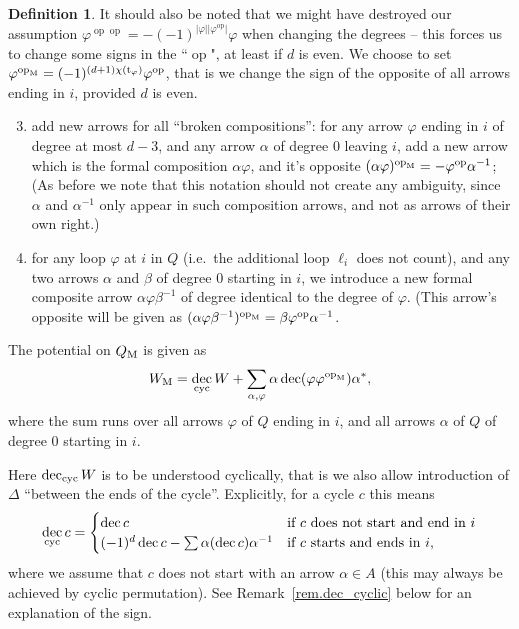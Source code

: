\documentclass[a4paper,11pt]{amsart}
\theoremstyle{definition}
\newtheorem{definition}[theorem]{Definition}
\DeclareMathOperator{\op}{op}
\DeclareMathOperator{\dec}{dec}
\newcommand{\m}{_{\rm M}}
\newcommand{\ci}[1]{\chi(#1)}
\numberwithin{theorem}{section}
\begin{document}
\begin{definition}
It should also be noted that we might have destroyed our assumption $\varphi^{\op \op} = - (-1)^{| \varphi| | \varphi^{\op} |} \varphi$ when changing the degrees -- this forces us to change some signs in the ``$\op$", at least if $d$ is even. We choose to set $\varphi^{\op\m} = (-1)^{(d+1) \ci{ \rm{t}_{\varphi}}} \varphi^{\op}$, that is we change the sign of the opposite of all arrows ending in $i$, provided $d$ is even.
\begin{enumerate}
\setcounter{enumi}{2}
\item add new arrows for all ``broken compositions'': for any arrow $\varphi$ ending in $i$ of degree at most $d-3$, and any arrow $\alpha$ of degree $0$ leaving $i$, add a new arrow which is the formal composition $\alpha \varphi$, and it's opposite $(\alpha \varphi)^{\op\m} = - \varphi^{\op} \alpha^{-1}$; (As before we note that this notation should not create any ambiguity, since $\alpha$ and $\alpha^{-1}$ only appear in such composition arrows, and not as arrows of their own right.)
\item for any loop $\varphi$ at $i$ in $Q$ (i.e.\ the additional loop $\ell_i$ does not count), and any two arrows $\alpha$ and $\beta$ of degree $0$ starting in $i$, we introduce a new formal composite arrow $\alpha \varphi \beta^{-1}$ of degree identical to the degree of $\varphi$. (This arrow's opposite will be given as $(\alpha \varphi \beta^{-1})^{\op\m} = \beta \varphi^{\op} \alpha^{-1}$.
\end{enumerate}
The potential on $Q\m$ is given as
\[ W_{\rm M} = \dec_{\rm cyc} W + \sum_{\alpha, \varphi} \alpha \dec( \varphi \varphi^{\op\m} ) \alpha^*, \]
where the sum runs over all arrows $\varphi$ of $Q$ ending in $i$, and all arrows $\alpha$ of $Q$ of degree $0$ starting in $i$.

Here $\dec_{\rm cyc} W$ is to be understood cyclically, that is we also allow introduction of $\Delta$ ``between the ends of the cycle''. Explicitly, for a cycle $c$ this means
\[ \dec_{\rm cyc} c = \begin{cases} \dec c & \text{if $c$ does not start and end in $i$} \\ (-1)^d \dec c - \sum \alpha (\dec c) \alpha^{-1} & \text{if $c$ starts and ends in $i$,} \end{cases}  \]
where we assume that $c$ does not start with an arrow $\alpha \in A$ (this may always be achieved by cyclic permutation).
See Remark~\ref{rem.dec_cyclic} below for an explanation of the sign.
\end{definition}
\end{document}
